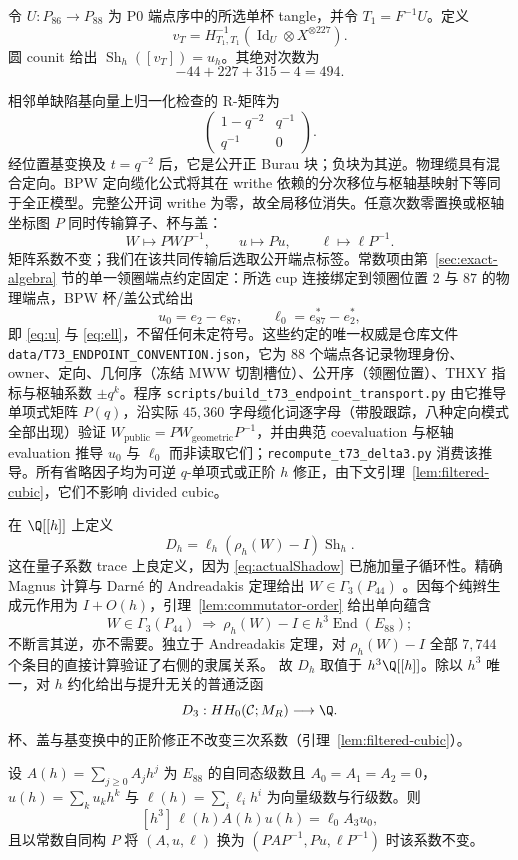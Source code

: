 令 $U:P_{86}\to P_{88}$ 为 P0 端点序中的所选单杯 tangle，并令 $T_1=F^{-1}U$。定义
\[
v_T=H_{T_1,T_1}^{-1}
  (\operatorname{Id}_U\otimes X^{\otimes227}).
\]
圆 counit 给出
$\operatorname{Sh}_h([v_T])=u_h$。其绝对次数为
\[
-44+227+315-4=494.
\]

相邻单缺陷基向量上归一化检查的 R-矩阵为
\[
\begin{pmatrix}1-q^{-2}&q^{-1}\\q^{-1}&0\end{pmatrix}.
\]
经位置基变换及 $t=q^{-2}$ 后，它是公开正 Burau 块；负块为其逆。物理缆具有混合定向。BPW 定向缆化公式将其在 writhe 依赖的分次移位与枢轴基映射下等同于全正模型。完整公开词 writhe 为零，故全局移位消失。任意次数零置换或枢轴坐标图 $P$ 同时传输算子、杯与盖：
\[
W\mapsto PWP^{-1},\qquad u\mapsto Pu,\qquad
\ell\mapsto\ell P^{-1}.
\]
矩阵系数不变；我们在该共同传输后选取公开端点标签。常数项由第~\ref{sec:exact-algebra} 节的单一领圈端点约定固定：所选 cup 连接绑定到领圈位置 $2$ 与 $87$ 的物理端点，BPW 杯/盖公式给出
\[
u_0=e_2-e_{87},\qquad
\ell_0=e_{87}^*-e_2^*,
\]
即 \eqref{eq:u} 与 \eqref{eq:ell}，不留任何未定符号。这些约定的唯一权威是仓库文件 \texttt{data/T73\_ENDPOINT\_CONVENTION.json}，它为 $88$ 个端点各记录物理身份、owner、定向、几何序（冻结 MWW 切割槽位）、公开序（领圈位置）、THXY 指标与枢轴系数 $\pm q^k$。程序 \texttt{scripts/build\_t73\_endpoint\_transport.py} 由它推导单项式矩阵 $P(q)$，沿实际 $45{,}360$ 字母缆化词逐字母（带股跟踪，八种定向模式全部出现）验证 $W_{\mathrm{public}}=PW_{\mathrm{geometric}}P^{-1}$，并由典范 coevaluation 与枢轴 evaluation 推导 $u_0$ 与 $\ell_0$ 而非读取它们；\texttt{recompute\_t73\_delta3.py} 消费该推导。所有省略因子均为可逆 $q$-单项式或正阶 $h$ 修正，由下文引理~\ref{lem:filtered-cubic}，它们不影响 divided cubic。

在 $\Q[[h]]$ 上定义
\[
D_h=\ell_h(\rho_h(W)-I)\operatorname{Sh}_h.
\]
这在量子系数 trace 上良定义，因为 \eqref{eq:actualShadow} 已施加量子循环性。精确 Magnus 计算与 Darn\'e 的 Andreadakis 定理给出 $W\in\Gamma_3(P_{44})$ \cite[Theorem~6.2]{Darne2021}。因每个纯辫生成元作用为 $I+O(h)$，引理~\ref{lem:commutator-order} 给出单向蕴含
\[
W\in\Gamma_3(P_{44})\ \Longrightarrow\
\rho_h(W)-I\in h^3\operatorname{End}(E_{88});
\]
不断言其逆，亦不需要。独立于 Andreadakis 定理，对 $\rho_h(W)-I$ 全部 $7{,}744$ 个条目的直接计算验证了右侧的隶属关系。
故 $D_h$ 取值于 $h^3\Q[[h]]$。除以 $h^3$ 唯一，对 $h$ 约化给出与提升无关的普通泛函
\[
D_3:HH_0(\mathcal C;M_R)\longrightarrow\Q.
\]
杯、盖与基变换中的正阶修正不改变三次系数（引理~\ref{lem:filtered-cubic}）。

\begin{lemma}[滤过三次配对]\label{lem:filtered-cubic}
设 $A(h)=\sum_{j\ge0}A_jh^j$ 为 $E_{88}$ 的自同态级数且 $A_0=A_1=A_2=0$，$u(h)=\sum_k u_kh^k$ 与 $\ell(h)=\sum_i\ell_ih^i$ 为向量级数与行级数。则
\[
[h^3]\,\ell(h)A(h)u(h)=\ell_0A_3u_0,
\]
且以常数自同构 $P$ 将 $(A,u,\ell)$ 换为 $(PAP^{-1},Pu,\ell P^{-1})$ 时该系数不变。
\end{lemma}

